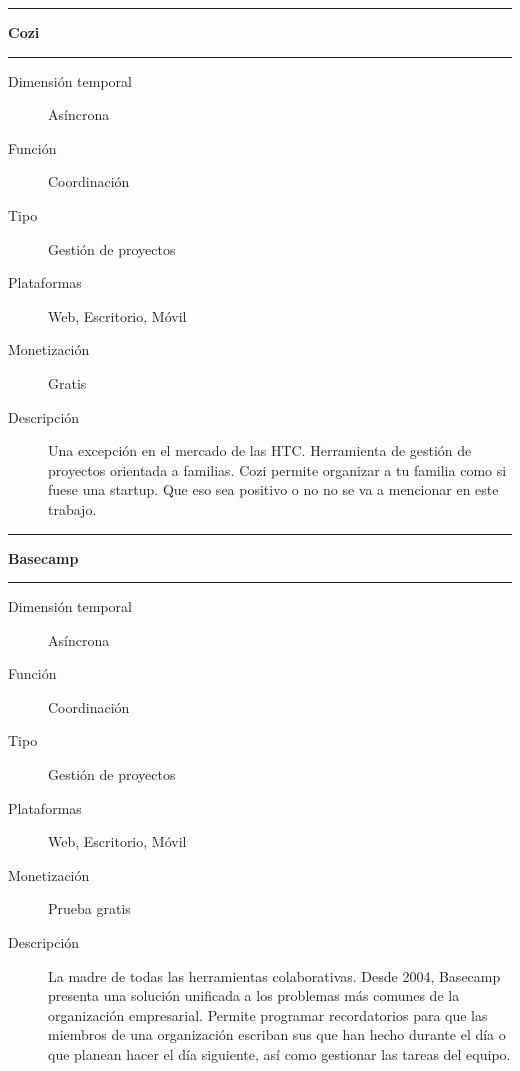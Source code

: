 \noindent\rule{\textwidth}{0.5pt}

{ \large \textbf{Cozi} }

\noindent\rule{\textwidth}{0.5pt}

\begin{description}
    \item[Dimensión temporal] Asíncrona
    \item[Función] Coordinación
    \item[Tipo] Gestión de proyectos
    \item[Plataformas] Web, Escritorio, Móvil
    \item[Monetización] Gratis
    \item[Descripción]
    Una excepción en el mercado de las HTC. Herramienta de gestión de proyectos orientada a familias. Cozi permite organizar a tu familia como si fuese una startup. Que eso sea positivo o no no se va a mencionar en este trabajo. 
\end{description}

\noindent\rule{\textwidth}{0.5pt}

{ \large \textbf{Basecamp} }

\noindent\rule{\textwidth}{0.5pt}

\begin{description}
    \item[Dimensión temporal] Asíncrona
    \item[Función] Coordinación
    \item[Tipo] Gestión de proyectos
    \item[Plataformas] Web, Escritorio, Móvil
    \item[Monetización] Prueba gratis
    \item[Descripción]
    La madre de todas las herramientas colaborativas. Desde 2004, Basecamp presenta una solución unificada a los problemas más comunes de la organización empresarial. Permite programar recordatorios para que las miembros de una organización escriban sus que han hecho durante el día o que planean hacer el día siguiente, así como gestionar las tareas del equipo.  
\end{description}